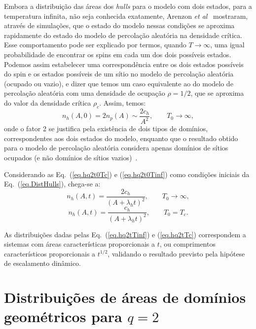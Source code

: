 Embora a distribuição das áreas dos \textit{hulls} para o modelo com dois estados, para a temperatura infinita, não seja conhecida exatamente, Arenzon \textit{et al}~\cite{PRLJeferson} mostraram, através de simulações, que o estado do modelo nessas condições se aproxima rapidamente do estado do modelo de percolação aleatória na densidade crítica. Esse comportamento pode ser explicado por termos, quando $T \rightarrow \infty$, uma igual probabilidade de encontrar os spins em cada um dos dois possíveis estados. Podemos assim estabelecer uma correspondência entre os dois estados possíveis do spin e os estados possíveis de um sítio no modelo de percolação aleatória (ocupado ou vazio), e dizer que temos um caso equivalente ao do modelo de percolação aleatória com uma densidade de ocupação $\rho = 1/2$, que se aproxima do valor da densidade crítica $\rho_c$. Assim, temos:
\begin{equation}
 \label{eq.hq2t0Tinf}
 n_h(A,0) = 2 n_p(A) \sim \frac{2c_h}{A^2}, \qquad T_0 \rightarrow \infty,
\end{equation}
onde o fator 2 se justifica pela existência de dois tipos de domínios, correspondentes aos dois estados do modelo, enquanto que o resultado obtido para o modelo de percolação aleatória considera apenas domínios de sítios ocupados (e não domínios de sítios vazios)~\cite{PRLJeferson}.

Considerando as Eq.~(\ref{eq.hq2t0Tc}) e (\ref{eq.hq2t0Tinf}) como condições iniciais da Eq.~(\ref{eq.DistHulls}), chega-se a:
\begin{equation}
 \label{eq.hq2tTinf}
 n_h(A,t) = \frac{2c_h}{\left(A + \lambda_h t \right)^2}, \qquad T_0 \rightarrow \infty,
\end{equation}
\begin{equation}
 \label{eq.hq2tTc}
 n_h(A,t) = \frac{c_h}{\left(A + \lambda_h t\right)^2}, \qquad T_0 = T_c.
\end{equation}

As distribuições dadas pelas Eq.~(\ref{eq.hq2tTinf}) e (\ref{eq.hq2tTc}) correspondem a sistemas com áreas características proporcionais a $t$, ou comprimentos característicos proporcionais a $t^{1/2}$, validando o resultado previsto pela hipótese de escalamento dinâmico.


\section{Distribuições de áreas de domínios geométricos para $q=2$}
\label{sec.DistAreasDomGeo}

